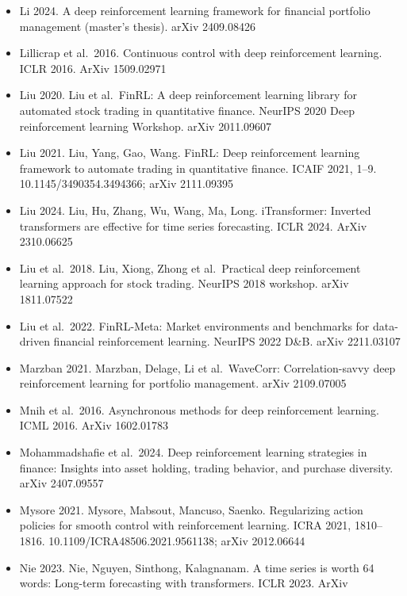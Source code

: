 \documentclass[12pt,a4paper]{report}
\begin{document}
\begin{itemize}
  Li 2023. Jiahao Li, Yong Zhang, Xingyu Yang, Liangwei Chen. Online
  portfolio management via deep reinforcement learning with
  high-frequency data. Information Processing \& Management
  60(3):103247, 2023. 10.1016/j.ipm.2022.103247
\item
  Li 2024. A deep reinforcement learning framework for financial
  portfolio management (master's thesis). arXiv 2409.08426
\item
  Lillicrap et al.~2016. Continuous control with deep reinforcement
  learning. ICLR 2016. ArXiv 1509.02971
\item
  Liu 2020. Liu et al.~FinRL: A deep reinforcement learning library for
  automated stock trading in quantitative finance. NeurIPS 2020 Deep
  reinforcement learning Workshop. arXiv 2011.09607
\item
  Liu 2021. Liu, Yang, Gao, Wang. FinRL: Deep reinforcement learning
  framework to automate trading in quantitative finance. ICAIF 2021,
  1--9. 10.1145/3490354.3494366; arXiv 2111.09395
\item
  Liu 2024. Liu, Hu, Zhang, Wu, Wang, Ma, Long. iTransformer: Inverted
  transformers are effective for time series forecasting. ICLR 2024.
  ArXiv 2310.06625
\item
  Liu et al.~2018. Liu, Xiong, Zhong et al.~Practical deep reinforcement
  learning approach for stock trading. NeurIPS 2018 workshop. arXiv
  1811.07522
\item
  Liu et al.~2022. FinRL-Meta: Market environments and benchmarks for
  data-driven financial reinforcement learning. NeurIPS 2022 D\&B. arXiv
  2211.03107
\item
  Marzban 2021. Marzban, Delage, Li et al.~WaveCorr: Correlation-savvy
  deep reinforcement learning for portfolio management. arXiv 2109.07005
\item
  Mnih et al.~2016. Asynchronous methods for deep reinforcement
  learning. ICML 2016. ArXiv 1602.01783
\item
  Mohammadshafie et al.~2024. Deep reinforcement learning strategies in
  finance: Insights into asset holding, trading behavior, and purchase
  diversity. arXiv 2407.09557
\item
  Mysore 2021. Mysore, Mabsout, Mancuso, Saenko. Regularizing action
  policies for smooth control with reinforcement learning. ICRA 2021,
  1810--1816. 10.1109/ICRA48506.2021.9561138; arXiv 2012.06644
\item
  Nie 2023. Nie, Nguyen, Sinthong, Kalagnanam. A time series is worth 64
  words: Long-term forecasting with transformers. ICLR 2023. ArXiv

\end{itemize}
\end{document}
